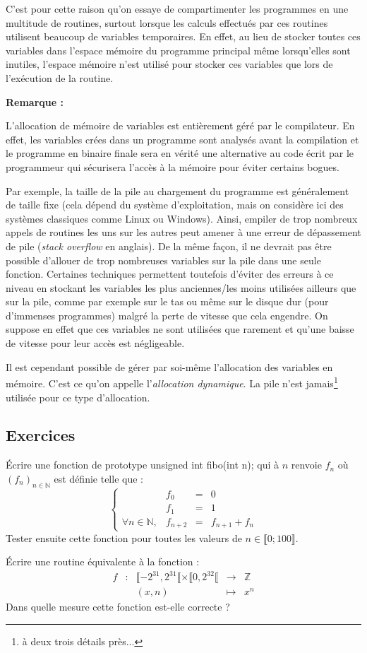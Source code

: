 \documentclass[../../../main.tex]{subfiles}
\begin{document}
C'est pour cette raison qu'on essaye de compartimenter les programmes en une multitude de routines, surtout lorsque les calculs effectués par ces routines utilisent beaucoup de variables temporaires. En effet, au lieu de stocker toutes ces variables dans l'espace mémoire du programme principal même lorsqu'elles sont inutiles, l'espace mémoire n'est utilisé pour stocker ces variables que lors de l'exécution de la routine.
 
\textbf{Remarque :}
 
L'allocation de mémoire de variables est entièrement géré par le compilateur. En effet, les variables crées dans un programme sont analysés avant la compilation et le programme en binaire finale sera en vérité une alternative au code écrit par le programmeur qui sécurisera l'accès à la mémoire pour éviter certains bogues.
 
Par exemple, la taille de la pile au chargement du programme est généralement de taille fixe (cela dépend du système d'exploitation, mais on considère ici des systèmes classiques comme Linux ou Windows). Ainsi, empiler de trop nombreux appels de routines les uns sur les autres peut amener à une erreur de dépassement de pile (\textit{stack overflow} en anglais). De la même façon, il ne devrait pas être possible d'allouer de trop nombreuses variables sur la pile dans une seule fonction. Certaines techniques permettent toutefois d'éviter des erreurs à ce niveau en stockant les variables les plus anciennes/les moins utilisées ailleurs que sur la pile, comme par exemple sur le tas ou même sur le disque dur (pour d'immenses programmes) malgré la perte de vitesse que cela engendre. On suppose en effet que ces variables ne sont utilisées que rarement et qu'une baisse de vitesse pour leur accès est négligeable.
 
Il est cependant possible de gérer par soi-même l'allocation des variables en mémoire. C'est ce qu'on appelle l'\textit{allocation dynamique}. La pile n'est jamais\footnote{à deux trois détails près...} utilisée pour ce type d'allocation.
\subsection{Exercices}
\newline Écrire une fonction de prototype \textsf{unsigned int fibo(int n);} qui à $n$ renvoie $f_{n}$ où $(f_{n})_{n\in{\mathbb{N}}}$ est définie telle que :
 $$
\left\{\begin{array}{llcl}
& f_{0} & = & 0 \\
& f_{1} & = & 1 \\
\forall{n\in{\mathbb{N}}}, & f_{n+2} & = & f_{n+1} + f_{n}
\end{array}\right.
$$
Tester ensuite cette fonction pour toutes les valeurs de $n\in{\llbracket 0; 100\rrbracket}$.
 
 Écrire une routine équivalente à la fonction :
 $$
 \begin{array}{lclcl}
f & : & \llbracket-2^{31}, 2^{31}\llbracket\times{\llbracket0, 2^{32}\llbracket}& \rightarrow & \mathbb{Z} \\
& & (x, n) & \mapsto & x^{n}
\end{array}
$$
Dans quelle mesure cette fonction est-elle correcte ?
\end{document}
